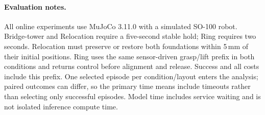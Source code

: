 \paragraph{Evaluation notes.}
All online experiments use MuJoCo 3.11.0 with a simulated SO-100 robot.
Bridge-tower and Relocation require a five-second stable hold; Ring requires two
seconds. Relocation must preserve or restore both foundations within 5\,mm of
their initial positions. Ring uses the same sensor-driven grasp/lift prefix in
both conditions and returns control before alignment and release. Success and
all costs include this prefix. One selected episode per condition/layout enters the analysis;
paired outcomes can differ, so the primary time means include timeouts rather
than selecting only successful episodes. Model time includes service waiting
and is not isolated inference compute time.
